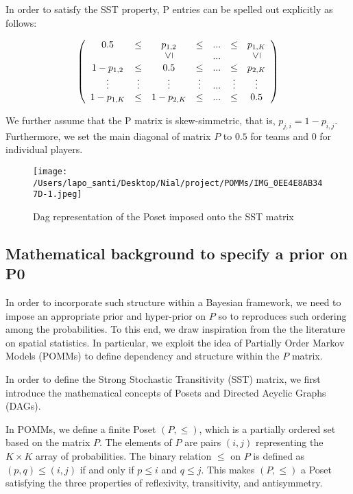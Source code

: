 \documentclass[11pt]{amsart}
\newcommand{\vertgeq}{\rotatebox{90}{$\leq$}}
\begin{document}
In order to satisfy the SST property, P entries can be spelled out explicitly as follows:
\begin{center}
$$
\left(\begin{array}{ccccccc} 0.5 & \leq & p_{1,2} & \leq &  ... & \leq & p_{1,K} \\  &  & \vertgeq &  & ... &  & \vertgeq \\
1 - p_{1,2} & \leq & 0.5 & \leq & ... & \leq & p_{2,K} \\ \vdots & \vdots & \vdots & \vdots &  ... & \vdots& \vdots \\ 1 - p_{1,K}& \leq & 1 - p_{2,K}& \leq & ... & \leq & 0.5\end{array}\right)
$$
\end{center}

We further assume that the P matrix is skew-simmetric, that is, $p_{j,i}= 1 - p_{i,j}$. Furthermore, we set the main diagonal of matrix $P$ to $0.5$ for teams and $0$ for individual players.

\begin{figure}
\begin{center}
\texttt{[image: /Users/lapo\_santi/Desktop/Nial/project/POMMs/IMG\_0EE4E8AB347D-1.jpeg]}
\caption{Dag representation of the Poset imposed onto the SST matrix}
\label{fig:DAG}
\end{center}
\end{figure}


\subsection{Mathematical background to specify a prior on P0}

In order to incorporate such structure within a Bayesian framework, we need to impose an appropriate prior and hyper-prior on $P$ so to reproduces such ordering among the probabilities. To this end, we draw inspiration from the the literature on spatial statistics. In particular, we exploit the idea of Partially Order Markov Models (POMMs) to define dependency and structure within the $P$ matrix. 


In order to define the Strong Stochastic Transitivity (SST) matrix, we first introduce the mathematical concepts of Posets and Directed Acyclic Graphs (DAGs).

In POMMs, we define a finite Poset $(P, \leq)$, which is a partially ordered set based on the matrix $P$. The elements of $P$ are pairs $(i, j)$ representing the $K \times K$ array of probabilities. The binary relation $\leq$ on $P$ is defined as $(p, q) \leq (i, j)$ if and only if $p \leq i$ and $q \leq j$. This makes $(P, \leq)$ a Poset satisfying the three properties of reflexivity, transitivity, and antisymmetry.
\end{document}

